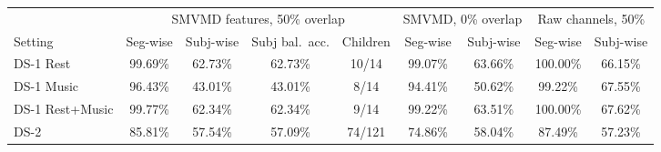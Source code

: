 \begin{tabular}{l cccc cc cc}
\toprule
 & \multicolumn{4}{c}{SMVMD features, 50\% overlap} & \multicolumn{2}{c}{SMVMD, 0\% overlap} & \multicolumn{2}{c}{Raw channels, 50\%}\\
\cmidrule(lr){2-5}\cmidrule(lr){6-7}\cmidrule(lr){8-9}
Setting & Seg-wise & Subj-wise & Subj bal.\ acc. & Children & Seg-wise & Subj-wise & Seg-wise & Subj-wise\\
\midrule
DS-1 Rest & 99.69\% & 62.73\% & 62.73\% & 10/14 & 99.07\% & 63.66\% & 100.00\% & 66.15\% \\
DS-1 Music & 96.43\% & 43.01\% & 43.01\% & 8/14 & 94.41\% & 50.62\% & 99.22\% & 67.55\% \\
DS-1 Rest+Music & 99.77\% & 62.34\% & 62.34\% & 9/14 & 99.22\% & 63.51\% & 100.00\% & 67.62\% \\
DS-2 & 85.81\% & 57.54\% & 57.09\% & 74/121 & 74.86\% & 58.04\% & 87.49\% & 57.23\% \\
\bottomrule
\end{tabular}
